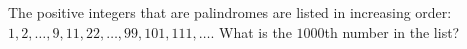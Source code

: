 The positive integers that are palindromes are listed in increasing order: $1,2,\dots,9,11,22,\dots,99,101,111,\dots$. What is the $1000$th number in the list?

